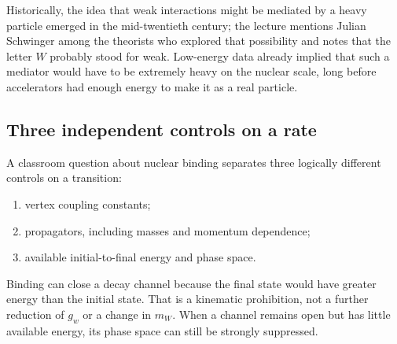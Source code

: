 Historically, the idea that weak interactions might be mediated by a heavy
particle emerged in the mid-twentieth century; the lecture mentions Julian
Schwinger among the theorists who explored that possibility and notes that the
letter \(W\) probably stood for weak. Low-energy data already implied that
such a mediator would have to be extremely heavy on the nuclear scale, long
before accelerators had enough energy to make it as a real particle.

\subsection{Three independent controls on a rate}

A classroom question about nuclear binding separates three logically
different controls on a transition:
\begin{enumerate}
  \item vertex coupling constants;
  \item propagators, including masses and momentum dependence;
  \item available initial-to-final energy and phase space.
\end{enumerate}
Binding can close a decay channel because the final state would have greater
energy than the initial state. That is a kinematic prohibition, not a further
reduction of \(g_w\) or a change in \(m_W\). When a channel remains open but
has little available energy, its phase space can still be strongly
suppressed.

\begin{classroomqa}
\end{classroomqa}

\begin{classroomqa}
\end{classroomqa}

